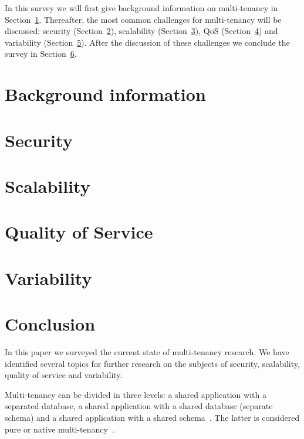 \documentclass{article}
\begin{document}
In this survey we will first give background information on multi-tenancy in Section~\ref{sec:bg}. Thereafter, the most common challenges for multi-tenancy will be discussed: security (Section~\ref{sec:security}), scalability (Section~\ref{sec:scalability}), \ac{QoS} (Section~\ref{sec:qos}) and variability (Section~\ref{sec:variability}). After the discussion of these challenges we conclude the survey in Section~\ref{sec:conclusion}.

\section{Background information}
\label{sec:bg}


\section{Security}
\label{sec:security}


\section{Scalability}
\label{sec:scalability}


\section{Quality of Service}
\label{sec:qos}


\section{Variability}
\label{sec:variability}


\section{Conclusion}
\label{sec:conclusion}
In this paper we surveyed the current state of multi-tenancy research.
We have identified several topics for further research on the subjects of security, scalability, quality of service and variability.

Multi-tenancy can be divided in three levels: a shared application with a separated database, a shared application with a shared database (separate schema) and a shared application with a shared schema~\cite{bezemer2010multi}. The latter is considered pure or native multi-tenancy~\cite{bezemer2010multi,lin2009feedback,aulbach2009comparison}.
\end{document}
